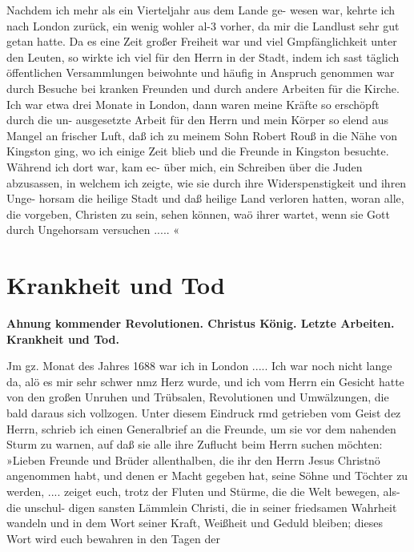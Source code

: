 Nachdem ich mehr als ein Vierteljahr aus dem Lande ge-
wesen war, kehrte ich nach London zurück, ein wenig wohler al-3
vorher, da mir die Landlust sehr gut getan hatte. Da es eine
Zeit großer Freiheit war und viel Gmpfänglichkeit unter den
Leuten, so wirkte ich viel für den Herrn in der Stadt, indem ich
sast täglich öffentlichen Versammlungen beiwohnte und häufig in
Anspruch genommen war durch Besuche bei kranken Freunden und
durch andere Arbeiten für die Kirche. Ich war etwa drei Monate
in London, dann waren meine Kräfte so erschöpft durch die un-
ausgesetzte Arbeit für den Herrn und mein Körper so elend aus
Mangel an frischer Luft, daß ich zu meinem Sohn Robert Rouß
in die Nähe von Kingston ging, wo ich einige Zeit blieb und die
Freunde in Kingston besuchte. Während ich dort war, kam ec-
über mich, ein Schreiben über die Juden abzusassen, in welchem
ich zeigte, wie sie durch ihre Widerspenstigkeit und ihren Unge-
horsam die heilige Stadt und daß heilige Land verloren hatten,
woran alle, die vorgeben, Christen zu sein, sehen können, waö
ihrer wartet, wenn sie Gott durch Ungehorsam versuchen ..... «

\chapter[Krankheit und Tod]{Krankheit und Tod}

\begin{center}
\textbf{Ahnung kommender Revolutionen. Christus König. Letzte
Arbeiten. Krankheit und Tod.}
\end{center}

Jm gz. Monat des Jahres 1688 war ich in London .....
Ich war noch nicht lange da, alö es mir sehr schwer nmz Herz
wurde, und ich vom Herrn ein Gesicht hatte von den großen
Unruhen und Trübsalen, Revolutionen und Umwälzungen, die bald
daraus sich vollzogen. Unter diesem Eindruck rmd getrieben vom
Geist dez Herrn, schrieb ich einen Generalbrief an die Freunde,
um sie vor dem nahenden Sturm zu warnen, auf daß sie alle
ihre Zuflucht beim Herrn suchen möchten:
»Lieben Freunde und Brüder allenthalben, die ihr den Herrn
Jesus Christnö angenommen habt, und denen er Macht gegeben
hat, seine Söhne und Töchter zu werden, .... zeiget euch, trotz
der Fluten und Stürme, die die Welt bewegen, als- die unschul-
digen sansten Lämmlein Christi, die in seiner friedsamen Wahrheit
wandeln und in dem Wort seiner Kraft, Weißheit und Geduld
bleiben; dieses Wort wird euch bewahren in den Tagen der


